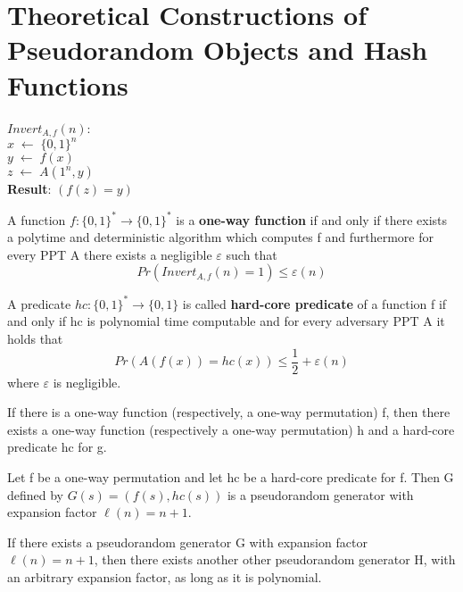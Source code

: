 \documentclass[../main]{subfiles}
\begin{document}
\chapter{Theoretical Constructions of Pseudorandom Objects
and Hash Functions}

$Invert_{A, f}(n)$:\\
$x \; \leftarrow{} \; \{0, 1\}^n$\\
$y\; \leftarrow{} \; f(x)$\\
$z \; \leftarrow{} \; A(1^n, y)$\\
\textbf{Result}: $(f(z)=y)$


\begin{definition}
    A function $f:\{0, 1\}^* \rightarrow \{0, 1\}^*$ is a \textbf{one-way function} if and only if there exists a polytime and deterministic algorithm which computes f and furthermore for every PPT A there exists a negligible $\varepsilon$ such that
    $$Pr(Invert_{A, f}(n)=1) \leq \varepsilon(n)$$
\end{definition}

\begin{definition}
    A predicate $hc:\{0, 1\}^* \rightarrow \{0, 1\}$ is called \textbf{hard-core predicate} of a function f if and only if hc is polynomial time computable and for every adversary PPT A it holds that
    $$Pr(A(f(x))=hc(x)) \leq \frac{1}{2} + \varepsilon(n) $$
    where $\varepsilon$ is negligible.
\end{definition}

\begin{theorem}
    If there is a one-way function (respectively, a one-way permutation) f, then there exists a one-way function (respectively a one-way permutation) h and a hard-core predicate hc for g.
\end{theorem}

\begin{theorem}
    Let f be a one-way permutation and let hc be a hard-core predicate for f.
    Then G defined by $G(s) = (f(s), hc(s))$ is a pseudorandom generator with expansion factor $\ell(n) = n+1$.
\end{theorem}

\begin{theorem}
    If there exists a pseudorandom generator G with expansion factor $\ell(n) = n+1$, then there exists another other pseudorandom generator H, with an arbitrary expansion factor, as long as it is polynomial.
\end{theorem}
\end{document}
